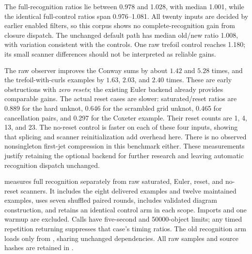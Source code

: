 

The full-recognition ratios lie between 0.978 and 1.028, with median
1.001, while the identical full-control ratios span 0.976--1.081.
All twenty inputs are decided by earlier enabled filters, so this corpus
shows no complete-recognition gain from closure dispatch.  The unchanged
default path has median old/new ratio 1.008, with variation consistent
with the controls.  One raw trefoil control reaches 1.180; its small
scanner differences should not be interpreted as reliable gains.

The raw observer improves the Conway sums by about $1.42$ and $5.28$
times, and the trefoil-with-curls examples by $1.63$, $2.03$, and $2.40$
times.  These are early obstructions with \emph{zero resets}; the existing
Euler backend already provides comparable gains.  The actual reset cases
are slower: saturated/reset ratios are 0.889 for the hard unknot, 0.646
for the scrambled grid unknot, 0.465 for cancellation pairs, and 0.297
for the Coxeter example.  Their reset counts are 1, 4, 13, and 23.
The no-reset control is faster on each of these four inputs, showing
that splicing and scanner reinitialization add overhead here.  There is
no observed nonsingleton first-jet compression in this benchmark either.
These measurements justify retaining the optional backend for further
research and leaving automatic recognition dispatch unchanged.

 measures full recognition separately
from raw saturated, Euler, reset, and no-reset scanners.  It includes the
eight delivered examples and twelve maintained examples, uses seven
shuffled paired rounds, includes validated diagram construction, and
retains an identical control arm in each scope.  Imports and one warmup
are excluded.  Calls have five-second and 50000-object limits; any timed
repetition returning  suppresses that case's timing ratios.
The old recognition arm loads only  from
, sharing unchanged dependencies.  All raw samples and
source hashes are retained in .
